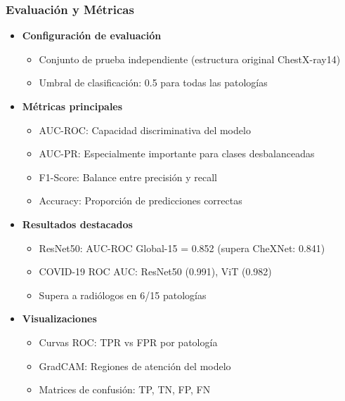 \begin{frame}
\frametitle{Evaluación y Métricas}
\begin{itemize}
    \item \textbf{Configuración de evaluación}
    \begin{itemize}
        \item Conjunto de prueba independiente (estructura original ChestX-ray14)
        \item Umbral de clasificación: 0.5 para todas las patologías
    \end{itemize}
    \item \textbf{Métricas principales}
    \begin{itemize}
        \item AUC-ROC: Capacidad discriminativa del modelo
        \item AUC-PR: Especialmente importante para clases desbalanceadas
        \item F1-Score: Balance entre precisión y recall
        \item Accuracy: Proporción de predicciones correctas
    \end{itemize}
    \item \textbf{Resultados destacados}
    \begin{itemize}
        \item ResNet50: AUC-ROC Global-15 = 0.852 (supera CheXNet: 0.841)
        \item COVID-19 ROC AUC: ResNet50 (0.991), ViT (0.982)
        \item Supera a radiólogos en 6/15 patologías
    \end{itemize}
    \item \textbf{Visualizaciones}
    \begin{itemize}
        \item Curvas ROC: TPR vs FPR por patología
        \item GradCAM: Regiones de atención del modelo
        \item Matrices de confusión: TP, TN, FP, FN
    \end{itemize}
\end{itemize}
\end{frame}
